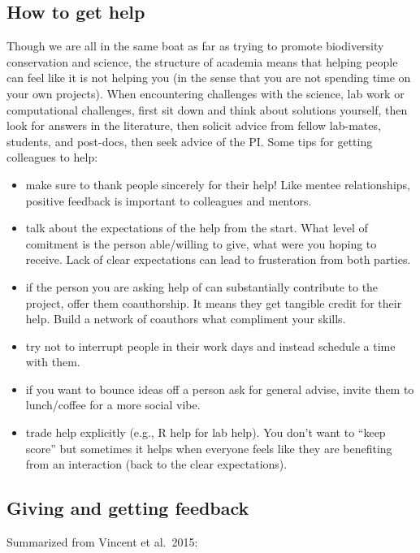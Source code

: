 \documentclass[12pt]{article}
\begin{document}
\subsection{How to get help}
\label{sec:help}
Though we are all in the same boat as far as trying to promote
biodiversity conservation and science, the structure of academia means
that helping people can feel like it is not helping you (in the sense
that you are not spending time on your own projects). When
encountering challenges with the science, lab work or computational
challenges, first sit down and think about solutions yourself, then
look for answers in the literature, then solicit advice from fellow
lab-mates, students, and post-docs, then seek advice of the PI. Some
tips for getting colleagues to help:
\begin{itemize}
\item make sure to thank people sincerely for their help! Like mentee
  relationships, positive feedback is important to colleagues and
  mentors.
  \item talk about the expectations of the help from the start. What
    level of comitment is the person able/willing to give, what were
    you hoping to receive. Lack of clear expectations can lead to
    frusteration from both parties.
  \item if the person you are asking help of can substantially
    contribute to the project, offer them coauthorship. It means they
    get tangible credit for their help. Build a network of coauthors
    what compliment your skills.
\item try not to interrupt people in their work days and instead
  schedule a time with them.
\item if you want to bounce ideas off a person ask for general advise,
  invite them to lunch/coffee for a more social vibe.
\item trade help explicitly (e.g., R help for lab help). You don't
  want to ``keep score'' but sometimes it helps when everyone feels
  like they are benefiting from an interaction (back to the clear
  expectations).
\end{itemize}

\subsection{Giving and getting feedback}
Summarized from Vincent et al.~2015:
\end{document}

